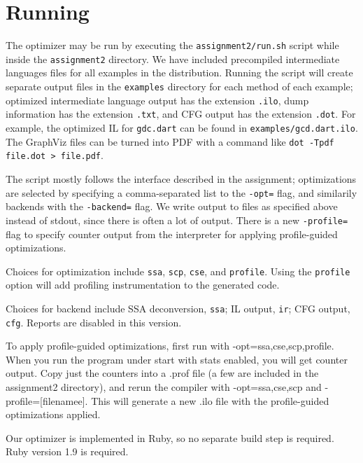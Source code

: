 \documentclass[10pt,twocolumn]{article}
\begin{document}
\section{Running}

The optimizer may be run by executing the \texttt{assignment2/run.sh}
script while inside the \texttt{assignment2} directory. We have
included precompiled intermediate languages files for all examples in
the distribution. Running the script will create separate output files
in the \texttt{examples} directory for each method of each example;
optimized intermediate language output has the extension
\texttt{.ilo}, dump information has the extension \texttt{.txt}, and
CFG output has the extension \texttt{.dot}. For example, the optimized
IL for \texttt{gdc.dart} can be found in
\texttt{examples/gcd.dart.ilo}. The GraphViz files can be turned into
PDF with a command like \texttt{dot -Tpdf file.dot > file.pdf}.

The script mostly follows the interface described in the assignment;
optimizations are selected by specifying a comma-separated list to the
\texttt{-opt=} flag, and similarily backends with the
\texttt{-backend=} flag. We write output to files as specified above
instead of stdout, since there is often a lot of output. There is a
new \texttt{-profile=} flag to specify counter output from the
interpreter for applying profile-guided optimizations.

Choices for optimization include \texttt{ssa}, \texttt{scp},
\texttt{cse}, and \texttt{profile}. Using the \texttt{profile} option
will add profiling instrumentation to the generated code.

Choices for backend include SSA deconversion, \texttt{ssa}; IL output,
\texttt{ir}; CFG output, \texttt{cfg}. Reports are disabled in this
version.

To apply profile-guided optimizations, first run with
-opt=ssa,cse,scp,profile. When you run the program under start with
stats enabled, you will get counter output. Copy just the counters
into a .prof file (a few are included in the assignment2 directory),
and rerun the compiler with -opt=ssa,cse,scp and
-profile=[filenamee]. This will generate a new .ilo file with the
profile-guided optimizations applied.

Our optimizer is implemented in Ruby, so no separate build step is
required. Ruby version 1.9 is required. 






\end{document}
